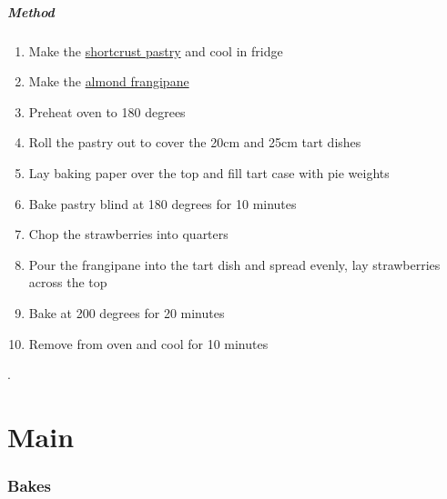 \documentclass[]{article}
\begin{document}
\subsubsection*{\Large Method}
\begin{enumerate}[font=\huge\color{accent}]
	\item Make the \hyperref[rec:Shortcrust Pastry]{shortcrust pastry} and cool in fridge
	\item Make the \hyperref[rec:Almond frangipane]{almond frangipane}
	\item Preheat oven to 180 degrees
	\item Roll the pastry out to cover the 20cm and 25cm tart dishes
	\item Lay baking paper over the top and fill tart case with pie weights
	\item Bake pastry blind at 180 degrees for 10 minutes
	\item Chop the strawberries into quarters
	\item Pour the frangipane into the tart dish and spread evenly, lay strawberries across the top
	\item Bake at 200 degrees for 20 minutes
	\item Remove from oven and cool for 10 minutes
\end{enumerate}
\newpage

\newpage
\color{white}.\color{black}
\vspace{5cm}
\part{\Huge Main}
\newpage
{}
\section*{\center\Huge\color{accent}Bakes}
\label{cat:Bakes}
\label{rec:Enchiladas}
\end{document}
